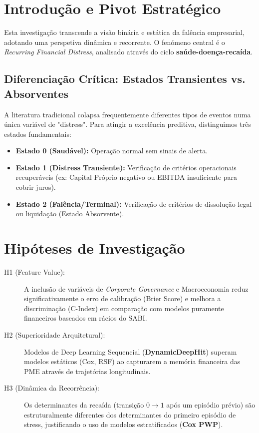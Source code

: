 \section{Introdução e Pivot Estratégico}

Esta investigação transcende a visão binária e estática da falência empresarial, adotando uma perspetiva dinâmica e recorrente. O fenómeno central é o \textit{Recurring Financial Distress}, analisado através do ciclo \textbf{saúde-doença-recaída}.

\subsection{Diferenciação Crítica: Estados Transientes vs. Absorventes}
A literatura tradicional colapsa frequentemente diferentes tipos de eventos numa única variável de "distress". Para atingir a excelência preditiva, distinguimos três estados fundamentais:
\begin{itemize}
    \item \textbf{Estado 0 (Saudável):} Operação normal sem sinais de alerta.
    \item \textbf{Estado 1 (Distress Transiente):} Verificação de critérios operacionais recuperáveis (ex: Capital Próprio negativo ou EBITDA insuficiente para cobrir juros).
    \item \textbf{Estado 2 (Falência/Terminal):} Verificação de critérios de dissolução legal ou liquidação (Estado Absorvente).
\end{itemize}

\section{Hipóteses de Investigação}

\begin{description}
    \item[H1 (Feature Value):] A inclusão de variáveis de \textit{Corporate Governance} e Macroeconomia reduz significativamente o erro de calibração (Brier Score) e melhora a discriminação (C-Index) em comparação com modelos puramente financeiros baseados em rácios do SABI.
    \item[H2 (Superioridade Arquitetural):] Modelos de Deep Learning Sequencial (\textbf{DynamicDeepHit}) superam modelos estáticos (Cox, RSF) ao capturarem a memória financeira das PME através de trajetórias longitudinais.
    \item[H3 (Dinâmica da Recorrência):] Os determinantes da recaída (transição $0 \to 1$ após um episódio prévio) são estruturalmente diferentes dos determinantes do primeiro episódio de stress, justificando o uso de modelos estratificados (\textbf{Cox PWP}).
\end{description}

